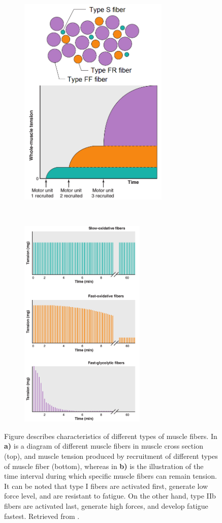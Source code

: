 \begin{figure}[ht!]
    \centering
    \begin{subfigure}[t]{0.45\textwidth}
        \centering
        \includegraphics[height=4in]{Images/introduction/fiber_distribution.png}
        \caption{}
    \end{subfigure}%
    ~ 
    \begin{subfigure}[t]{0.45\textwidth}
        \centering
        \includegraphics[height=4in]{Images/introduction/fiber_fatigue.png}
        \caption{}
    \end{subfigure}
    \caption{Figure describes characteristics of different types of muscle fibers. In \textbf{a)} is a diagram of different muscle fibers in muscle cross section (top), and muscle tension produced by recruitment of different types of muscle fiber (bottom), whereas in \textbf{b)} is the illustration of the time interval during which specific muscle fibers can remain tension. It can be noted that type I fibers are activated first, generate low force level, and are resistant to fatigue. On the other hand, type IIb fibers are activated last, generate high forces, and develop fatigue fastest. Retrieved from \citet{Widmaier2014}.}
\label{fig:fibers}
\end{figure}


